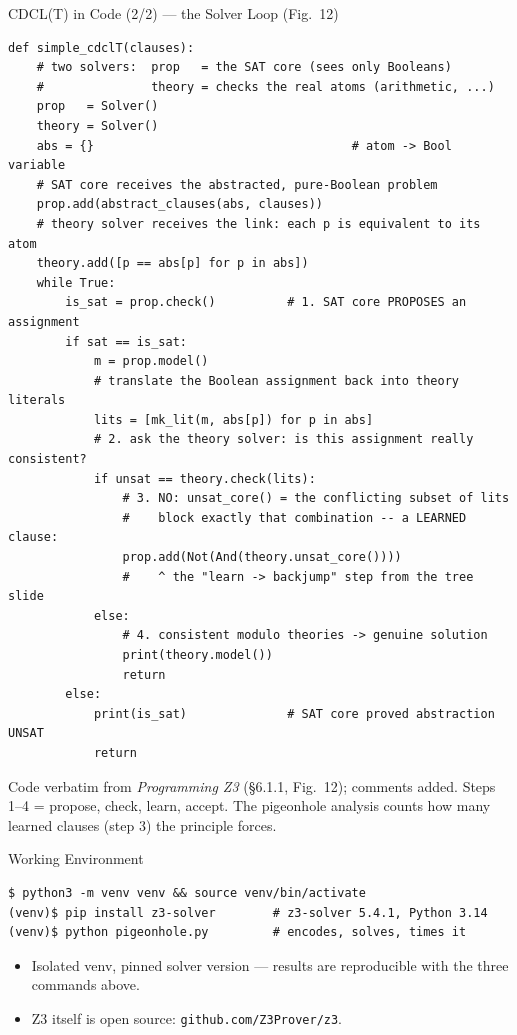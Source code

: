 \documentclass[10pt,aspectratio=169,xcolor={table}]{beamer}
\begin{document}
\begin{frame}[fragile]{CDCL(T) in Code (2/2) --- the Solver Loop (Fig.~12)}
\begin{lstlisting}[style=py,basicstyle=\ttfamily\tiny]
def simple_cdclT(clauses):
    # two solvers:  prop   = the SAT core (sees only Booleans)
    #               theory = checks the real atoms (arithmetic, ...)
    prop   = Solver()
    theory = Solver()
    abs = {}                                    # atom -> Bool variable
    # SAT core receives the abstracted, pure-Boolean problem
    prop.add(abstract_clauses(abs, clauses))
    # theory solver receives the link: each p is equivalent to its atom
    theory.add([p == abs[p] for p in abs])
    while True:
        is_sat = prop.check()          # 1. SAT core PROPOSES an assignment
        if sat == is_sat:
            m = prop.model()
            # translate the Boolean assignment back into theory literals
            lits = [mk_lit(m, abs[p]) for p in abs]
            # 2. ask the theory solver: is this assignment really consistent?
            if unsat == theory.check(lits):
                # 3. NO: unsat_core() = the conflicting subset of lits
                #    block exactly that combination -- a LEARNED clause:
                prop.add(Not(And(theory.unsat_core())))
                #    ^ the "learn -> backjump" step from the tree slide
            else:
                # 4. consistent modulo theories -> genuine solution
                print(theory.model())
                return
        else:
            print(is_sat)              # SAT core proved abstraction UNSAT
            return
\end{lstlisting}
  {\scriptsize Code verbatim from \emph{Programming Z3} (\S6.1.1, Fig.~12);
   comments added. Steps 1--4 = propose, check, \alert{learn}, accept. The
   pigeonhole analysis counts how many learned clauses (step 3) the
   principle forces.}
\end{frame}

\begin{frame}[fragile]{Working Environment}
\begin{lstlisting}[style=sh]
$ python3 -m venv venv && source venv/bin/activate
(venv)$ pip install z3-solver        # z3-solver 5.4.1, Python 3.14
(venv)$ python pigeonhole.py         # encodes, solves, times it
\end{lstlisting}
  \begin{itemize}\itemsep2pt
    \item Isolated venv, pinned solver version --- results are
          reproducible with the three commands above.
    \item Z3 itself is open source:
          \texttt{github.com/Z3Prover/z3}.
  \end{itemize}
\end{frame}
\end{document}
